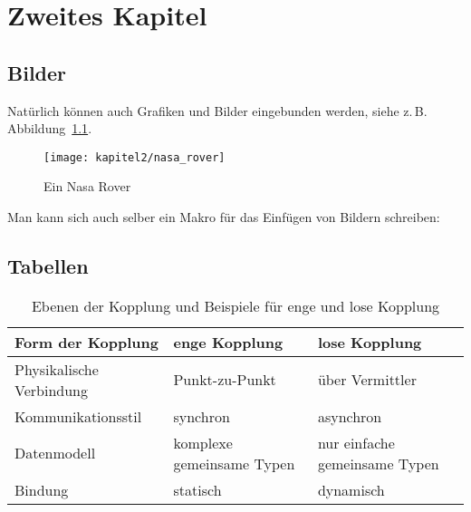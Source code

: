 \chapter{Zweites Kapitel}
\label{Kap2}

\section{Bilder}

Natürlich können auch Grafiken und Bilder eingebunden werden, siehe z.\,B. Abbildung~\ref{Kap2:NasaRover}.

\begin{figure}[h]
  \centering
  \texttt{[image: kapitel2/nasa\_rover]}
  \caption{Ein Nasa Rover}
  \label{Kap2:NasaRover}
\end{figure}

\blindtext[2]

Man kann sich auch selber ein Makro für das Einfügen von Bildern schreiben:


\blindtext[2]

\clearpage %

\section{Tabellen}

\blindtext[1]

\begin{table}
  \renewcommand{\arraystretch}{1.2}
  \centering
  \sffamily
  \begin{footnotesize}
    \begin{tabular}{l l l}
    \toprule
    \textbf{Form der Kopplung} & \textbf{enge Kopplung} & \textbf{lose Kopplung}\\
    \midrule
    Physikalische Verbindung	&	Punkt-zu-Punkt	& 	über Vermittler\\
    Kommunikationsstil	&	synchron		&	asynchron\\
    Datenmodell	&	komplexe gemeinsame Typen	&	nur einfache gemeinsame Typen\\
    Bindung	&	statisch		&	dynamisch\\
    \bottomrule
    \end{tabular}
  \end{footnotesize}
  \rmfamily
  \caption{Ebenen der Kopplung und Beispiele für enge und lose Kopplung}
  \label{Kap2:Kopplungsformen}
\end{table}

